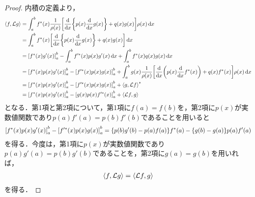 \documentclass{report}
\begin{document}
    \begin{proof}
      内積の定義より，
      \begin{align}
        \left\langle f, \mathcal{L}g \right\rangle &= \int_{a}^{b} f^*(x)\frac{1}{\rho(x)}\qty[\dv{x}\qty{p(x)\dv{x}g(x)} + q(x)g(x)]\rho(x)\dd{x} \\ 
        &= \int_{a}^{b} f^*(x)\qty[\dv{x}\qty{p(x)\dv{x}g(x)} + q(x)g(x)]\dd{x} \\ 
        &= \qty[f^*(x)g'(x)]_{a}^{b} - \int_{a}^{b}f'^*(x)p(x)g'(x)\dd{x} + \int_{a}^{b}f^*(x)q(x)g(x)\dd{x} \\ 
        &= \qty[f^*(x)p(x)g'(x)]_{a}^{b} - \qty[f'^*(x)p(x)g(x)]_{a}^{b} + \int_{a}^{b}g(x)\frac{1}{\rho(x)}\qty[\dv{x}\qty(p(x)\dv{x}f^*(x)) + q(x)f^*(x)]\rho(x)\dd{x} \\ 
        &= \qty[f^*(x)p(x)g'(x)]_{a}^{b} - \qty[f'^*(x)p(x)g(x)]_{a}^{b} + \left\langle g, \mathcal{L}f \right\rangle^* \\ 
        &= \qty[f^*(x)p(x)g'(x)]_{a}^{b} - \qty[g(x)p(x)f'^*(x)]_{a}^{b} + \left\langle \mathcal{L}f, g \right\rangle 
      \end{align}
      となる．第1項と第2項について，第1項に$f(a) = f(b)$を，第2項に$p(x)$が実数値関数であり$p(a)f'(a) = p(b)f'(b)$であることを用いると
      \begin{align}
        \qty[f^*(x)p(x)g'(x)]_{a}^{b} - \qty[f'^*(x)p(x)g(x)]_{a}^{b} = \qty{p(b)g'(b) - p(a)f(a)}f^*(a) - \qty{g(b) - g(a)}p(a)f'(a)
      \end{align}
      を得る．今度は，第1項に$p(x)$が実数値関数であり$p(a)g'(a) = p(b)g'(b)$であることを，第2項に$g(a) = g(b)$を用いれば，
      \begin{align}
        \left\langle f, \mathcal{L}g \right\rangle = \left\langle \mathcal{L}f, g \right\rangle
      \end{align}
      を得る．
    \end{proof}
\end{document}
